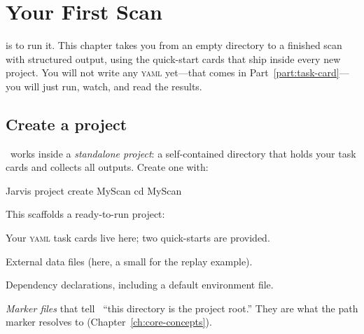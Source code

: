 \chapter{Your First Scan}
\label{ch:quickstart}

 is to run it. This chapter takes you from
an empty directory to a finished scan with structured output, using the quick-start cards
that ship inside every new project. You will not write any \textsc{yaml} yet---that comes in
Part~\ref{part:task-card}---you will just run, watch, and read the results.

\section{Create a project}
\label{sec:create-project}

\Jarvis\ works inside a \emph{standalone project}: a self-contained directory that holds your
task cards and collects all outputs. Create one with:

\begin{shellbox}
Jarvis project create MyScan
cd MyScan
\end{shellbox}

\noindent This scaffolds a ready-to-run project:

\begin{jfiletree}
\end{jfiletree}

\begin{description}[style=nextline, leftmargin=1.2em]
  \item[\dtfold{bin/}] Your \textsc{yaml} task cards live here; two quick-starts are provided.
  \item[\dtfold{data/}] External data files (here, a small  for the replay
        example).
  \item[\dtfold{deps/}] Dependency declarations, including a default environment file.
  \item[\dtmark{.jarvis-project.json}, \dtyaml{jarvis.project.yaml}] \emph{Marker files} that tell
        \Jarvis\ ``this directory is the project root.'' They are what the  path
        marker resolves to (Chapter~\ref{ch:core-concepts}).
\end{description}

